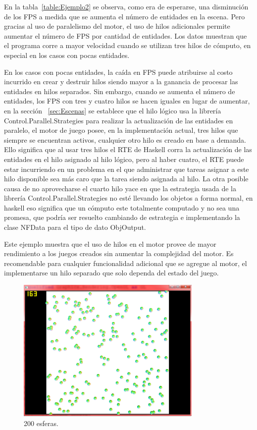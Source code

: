 En la tabla~\ref{table:Ejemplo2} se observa, como era de esperarse, una disminución de los FPS a medida que se aumenta el número de entidades en la escena. Pero gracias al uso de paralelismo del motor, el uso de hilos adicionales permite aumentar el número de FPS por cantidad de entidades. Los datos muestran que el programa corre a mayor velocidad cuando se utilizan tres hilos de cómputo, en especial en los casos con pocas entidades.

En los casos con pocas entidades, la caída en FPS puede atribuirse al costo incurrido en crear y destruir hilos siendo mayor a la ganancia de procesar las entidades en hilos separados. Sin embargo, cuando se aumenta el número de entidades, los FPS con tres y cuatro hilos se hacen iguales en lugar de aumentar, en la sección ~\ref{sec:Escenas} se establece que el hilo lógico usa la librería Control.Parallel.Strategies para realizar la actualización de las entidades en paralelo, el motor de juego posee, en la implementación actual, tres hilos que siempre se encuentran activos, cualquier otro hilo es creado en base a demanda. Ello significa que al usar tres hilos el RTE de Haskell corra la actualización de las entidades en el hilo asignado al hilo lógico, pero al haber cuatro, el RTE puede estar incurriendo en un problema en el que administrar que tareas asignar a este hilo disponible sea más caro que la tarea siendo asignada al hilo. La otra posible causa de no aprovecharse el cuarto hilo yace en que la estrategia usada de la librería Control.Parallel.Strategies no esté llevando los objetos a forma normal, en haskell eso significa que un cómputo este totalmente computado y no sea una promesa, que podría ser resuelto cambiando de estrategia e implementando la clase NFData para el tipo de dato ObjOutput.

Este ejemplo muestra que el uso de hilos en el motor provee de mayor rendimiento a los juegos creados sin aumentar la complejidad del motor. Es recomendable para cualquier funcionalidad adicional que se agregue al motor, el implementarse un hilo separado que solo dependa del estado del juego.

\begin{figure}[!ht!]
\centering
\includegraphics[width=0.8\textwidth]{sceenshot2}
\caption[Ejemplo 3]{200 esferas.}
\label{fig:Ejemplo_3}
\end{figure}

